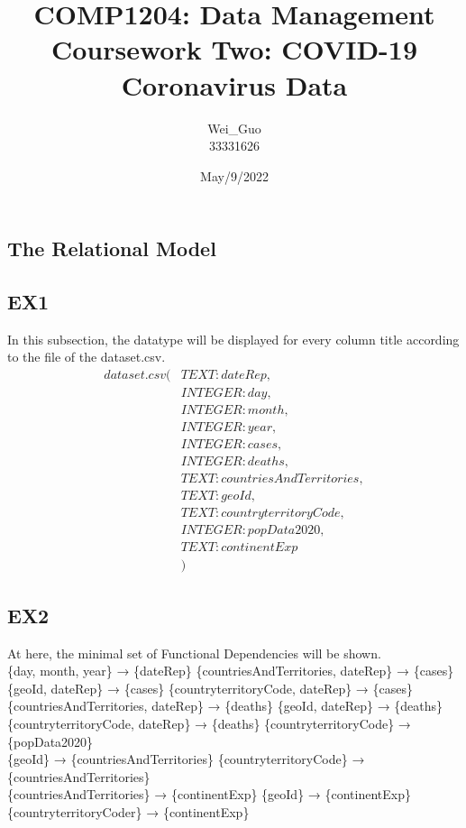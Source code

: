 \documentclass[]{article}
\title{COMP1204: Data Management \\ Coursework Two: COVID-19 Coronavirus Data }
\author{Wei\_Guo \\ 33331626}
\date{May/9/2022}
\begin{document}
	\begin{titlepage}
		
		\maketitle
		\section{The Relational Model}
		    \subsection{EX1}
		    In this subsection, the datatype will be displayed for every column title according to the file of the dataset.csv.
                \begin{align}
　              dataset.csv( &TEXT: dateRep,\\ &INTEGER: day,\\& INTEGER: month,\\& INTEGER: year,\\& INTEGER: cases,\\& INTEGER:                 deaths,\\& TEXT: countriesAndTerritories,\\& TEXT: geoId,\\& TEXT: countryterritoryCode,\\& INTEGER: popData2020,\\& TEXT: continentExp\\&)
　             \end{align}
		    \subsection{EX2}
		   At here, the minimal set of Functional Dependencies will be shown.\\
		   \{day, month, year\} → \{dateRep\}\qquad\qquad\qquad\qquad
		   \qquad\{countriesAndTerritories, dateRep\} → \{cases\}\\
		   \{geoId, dateRep\} → \{cases\}\qquad\qquad\qquad\qquad\qquad
		   \qquad\{countryterritoryCode, dateRep\} → \{cases\}\\
		   \{countriesAndTerritories, dateRep\} → \{deaths\}\qquad
		   \qquad\{geoId, dateRep\} → \{deaths\}\\
		   \{countryterritoryCode, dateRep\} → \{deaths\}\qquad
		   \qquad\{countryterritoryCode\} → \{popData2020\}\\
		   \{geoId\} → \{countriesAndTerritories\}\qquad\qquad\qquad
		   \qquad\{countryterritoryCode\} → \{countriesAndTerritories\}\\
		   \{countriesAndTerritories\} → \{continentExp\}\qquad\qquad
		   \qquad\{geoId\} → \{continentExp\}\\
		   \{countryterritoryCoder\} → \{continentExp\}

\end{titlepage}
\end{document}

